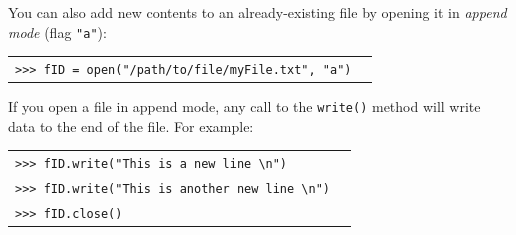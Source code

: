 \documentclass[t,handout,9pt]{beamer}
\begin{document}
\begin{frame}
\vfill
You can also add new contents to an already-existing file by opening it in \textit{append mode} (flag \texttt{"a"}):
\begin{table}[]
\begin{flushleft}
\begin{tabular}{ll}
\texttt{>{}>{}> fID = open("/path/to/file/myFile.txt", "a")} &  \\
\end{tabular}
\end{flushleft}
\end{table}
\vfill
If you open a file in append mode, any call to the \texttt{write()} method will write data to the end of the file.
\vfill
For example:
\begin{table}[]
\begin{flushleft}
\begin{tabular}{ll}
\texttt{>{}>{}> fID.write("This is a new line \textbackslash n")} &  \\
\texttt{>{}>{}> fID.write("This is another new line \textbackslash n")} &  \\
\texttt{>{}>{}> fID.close()} &  \\
\end{tabular}
\end{flushleft}
\end{table}
\vfill
\end{frame}
\end{document}
